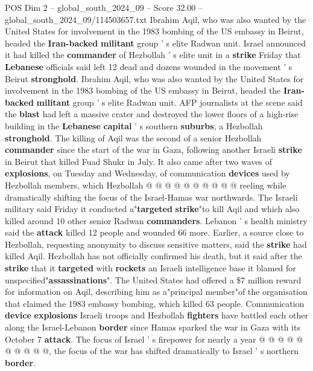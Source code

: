 \begin{textsample}{POS Dim 2 – global\_south\_2024\_09 – Score 32.00 – global\_south\_2024\_09/114503657.txt}  \label{ex:f2_pos_037}
Ibrahim Aqil, who was also wanted by the United States for involvement in the 1983 bombing of the US embassy in Beirut, headed the \textbf{Iran-backed} \textbf{militant} group ' s elite Radwan unit.
Israel announced it had killed the \textbf{commander} of Hezbollah ' s elite unit in a \textbf{strike} Friday that \textbf{Lebanese} officials said left 12 dead and dozens wounded in the movement ' s Beirut \textbf{stronghold}.
Ibrahim Aqil, who was also wanted by the United States for involvement in the 1983 bombing of the US embassy in Beirut, headed the \textbf{Iran-backed} \textbf{militant} group ' s elite Radwan unit.
AFP journalists at the scene said the \textbf{blast} had left a massive crater and destroyed the lower floors of a high-rise building in the \textbf{Lebanese} \textbf{capital} ' s southern \textbf{suburbs}, a Hezbollah \textbf{stronghold}.
The killing of Aqil was the second of a senior Hezbollah \textbf{commander} since the start of the war in Gaza, following another Israeli \textbf{strike} in Beirut that killed Fuad Shukr in July.
It also came after two waves of \textbf{explosions}, on Tuesday and Wednesday, of communication \textbf{devices} used by Hezbollah members, which Hezbollah @ @ @ @ @ @ @ @ @ @ reeling while dramatically shifting the focus of the Israel-Hamas war northwards.
The Israeli military said Friday it conducted a"\textbf{targeted} \textbf{strike}"to kill Aqil and which also killed around 10 other senior Radwan \textbf{commanders}.
Lebanon ' s health ministry said the \textbf{attack} killed 12 people and wounded 66 more.
Earlier, a source close to Hezbollah, requesting anonymity to discuss sensitive matters, said the \textbf{strike} had killed Aqil.
Hezbollah has not officially confirmed his death, but it said after the \textbf{strike} that it \textbf{targeted} with \textbf{rockets} an Israeli intelligence base it blamed for unspecified"\textbf{assassinations}".
The United States had offered a \$7 million reward for information on Aqil, describing him as a"principal member"of the organisation that claimed the 1983 embassy bombing, which killed 63 people.
Communication \textbf{device} \textbf{explosions} Israeli troops and Hezbollah \textbf{fighters} have battled each other along the Israel-Lebanon \textbf{border} since Hamas sparked the war in Gaza with its October 7 \textbf{attack}.
The focus of Israel ' s firepower for nearly a year @ @ @ @ @ @ @ @ @ @, the focus of the war has shifted dramatically to Israel ' s northern \textbf{border}.

\end{textsample}
